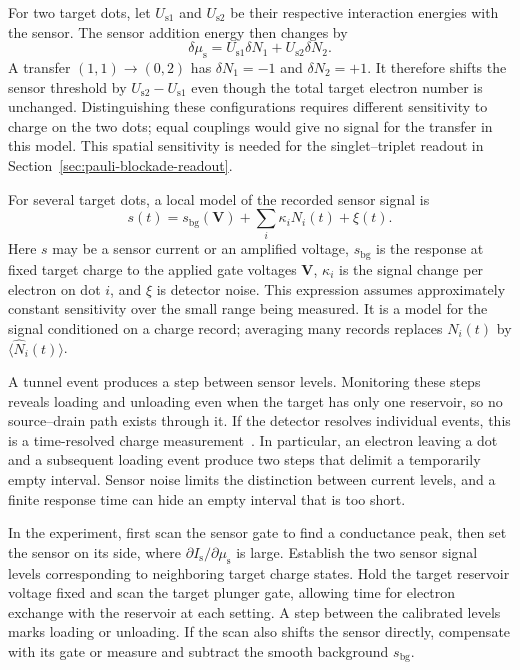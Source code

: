 For two target dots, let $U_{\mathrm{s}1}$ and $U_{\mathrm{s}2}$
be their respective interaction energies with the sensor. The
sensor addition energy then changes by
\begin{equation}
 \delta\mu_{\mathrm s}
   =U_{\mathrm{s}1}\delta N_1+U_{\mathrm{s}2}\delta N_2.
 \label{eq:measurement-sensor-charge-configuration}
\end{equation}
A transfer $(1,1)\to(0,2)$ has $\delta N_1=-1$ and $\delta N_2=+1$.
It therefore shifts the sensor threshold by
$U_{\mathrm{s}2}-U_{\mathrm{s}1}$ even though the total target
electron number is unchanged. Distinguishing these configurations
requires different sensitivity to charge on the two dots; equal
couplings would give no signal for the transfer in this model.
This spatial sensitivity is needed for the singlet--triplet
readout in Section~\ref{sec:pauli-blockade-readout}.

For several target dots, a local model of the recorded sensor
signal is
\begin{equation}
 s(t)=s_{\mathrm{bg}}(\mathbf V)
         +\sum_i\kappa_i N_i(t)+\xi(t).
 \label{eq:measurement-sensor-signal}
\end{equation}
Here $s$ may be a sensor current or an amplified voltage,
$s_{\mathrm{bg}}$ is the response at fixed target charge to the
applied gate voltages $\mathbf V$, $\kappa_i$ is the signal change
per electron on dot $i$, and $\xi$ is detector noise. This expression
assumes approximately constant sensitivity over the small range
being measured. It is a model for the signal conditioned on a charge
record; averaging many records replaces $N_i(t)$ by
$\langle\widehat N_i(t)\rangle$.

A tunnel event produces a step between sensor levels. Monitoring
these steps reveals loading and unloading even when the target
has only one reservoir, so no source--drain path exists through it.
If the detector resolves individual events, this is a time-resolved
charge measurement~\cite{Thalakulam2011}.
In particular, an electron leaving a dot and a subsequent loading
event produce two steps that delimit a temporarily empty interval.
Sensor noise limits the distinction between current levels, and
a finite response time can hide an empty interval that is too short.

In the experiment, first scan the sensor gate to find a conductance
peak, then set the sensor on its side, where
$\partial I_{\mathrm s}/\partial\mu_{\mathrm s}$ is large. Establish
the two sensor signal levels corresponding to neighboring target
charge states. Hold the target reservoir voltage fixed and scan
the target plunger gate, allowing time for electron exchange with
the reservoir at each setting. A step between the calibrated levels
marks loading or unloading. If the scan also shifts the sensor
directly, compensate with its gate or measure and subtract the
smooth background $s_{\mathrm{bg}}$.

